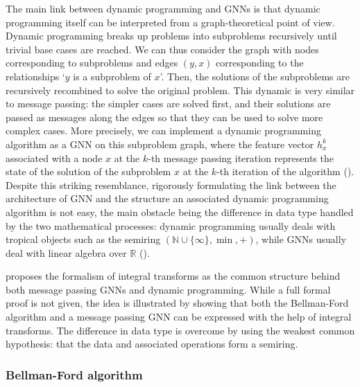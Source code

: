 \documentclass[11pt,a4paper,openright,twoside]{report}
\theoremstyle{plain}
\theoremstyle{definition}
\begin{document}
The main link between dynamic programming and GNNs is that dynamic programming itself can be interpreted from a graph-theoretical point of view. Dynamic programming breaks up problems into subproblems recursively until trivial base cases are reached. We can thus consider the graph with nodes corresponding to subproblems and edges $(y,x)$ corresponding to the relationships \lq $y$ is a subproblem of $x$\rq. Then, the solutions of the subproblems are recursively recombined to solve the original problem. This dynamic is very similar to message passing: the simpler cases are solved first, and their solutions are passed as messages along the edges so that they can be used to solve more complex cases. More precisely, we can implement a dynamic programming algorithm as a GNN on this subproblem graph, where the feature vector $h_x^{k}$ associated with a node $x$ at the $k$-th message passing iteration represents the state of the solution of the subproblem $x$ at the $k$-th iteration of the algorithm (\cite{xu2019can}). Despite this striking resemblance, rigorously formulating the link between the architecture of GNN and the structure an associated dynamic programming algorithm is not easy, the main obstacle being the difference in data type handled by the two mathematical processes: dynamic programming usually deals with tropical objects such as the semiring $(\mathbb{N} \cup \{\infty\}, \min, +)$, while GNNs usually deal with linear algebra over $\mathbb{R}$ (\cite{dudzik2022graph}).

\cite{dudzik2022graph} proposes the formalism of integral transforms as the common structure behind both message passing GNNs and dynamic programming. While a full formal proof is not given, the idea is illustrated by showing that both the Bellman-Ford algorithm and a message passing GNN can be expressed with the help of integral transforms. The difference in data type is overcome by using the weakest common hypothesis: that the data and associated operations form a semiring.

\subsubsection{Bellman-Ford algorithm}
\end{document}
